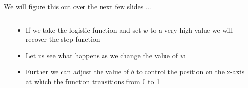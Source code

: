 \begin{frame}
	We will figure this out over the next few slides ...
\end{frame}

\begin{frame}
	\begin{columns}
		\begin{overlayarea}{\textwidth}{\textheight}
			\begin{onlyenv}
			\end{onlyenv}
		\end{overlayarea}
		\begin{overlayarea}{\textwidth}{\textheight}
			\begin{itemize}\justifying
				\item<1-> If we take the logistic function and set $w$ to a very high value we will recover the step function
				\item<2-> Let us see what happens as we change the value of $w$
				\item<45-> Further we can adjust the value of $b$ to control the position on the x-axis at which the function transitions from 0 to 1
			\end{itemize}
		\end{overlayarea}
	\end{columns}
\end{frame}

